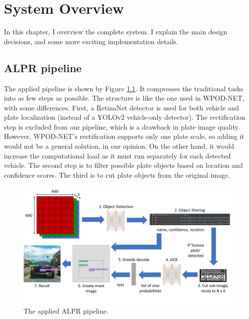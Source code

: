 \chapter{System Overview}

In this chapter, I overview the complete system. I explain the main design decisions, and some more exciting implementation details.

\section{ALPR pipeline}

The applied pipeline is shown by Figure \ref{fig:pipeline}. It compresses the traditional tasks into as few steps as possible. The structure is like the one used in WPOD-NET\cite{WPOD-NET}, with some differences. First, a RetinaNet\cite{RetinaNet} detector is used for both vehicle and plate localization (instead of a YOLOv2\cite{YOLOv2} vehicle-only detector). The rectification step is excluded from our pipeline, which is a drawback in plate image quality. However, WPOD-NET's rectification supports only one plate scale, so adding it would not be a general solution, in our opinion. On the other hand, it would increase the computational load as it must run separately for each detected vehicle. The second step is to filter possible plate objects based on location and confidence scores. The third is to cut plate objects from the original image.

\begin{figure}[H]
 \centerline{\includegraphics[width=1.0\columnwidth]{.//Figure/System/pipeline.png}}
 \caption{The applied ALPR pipeline.}
 \label{fig:pipeline}
\end{figure}

